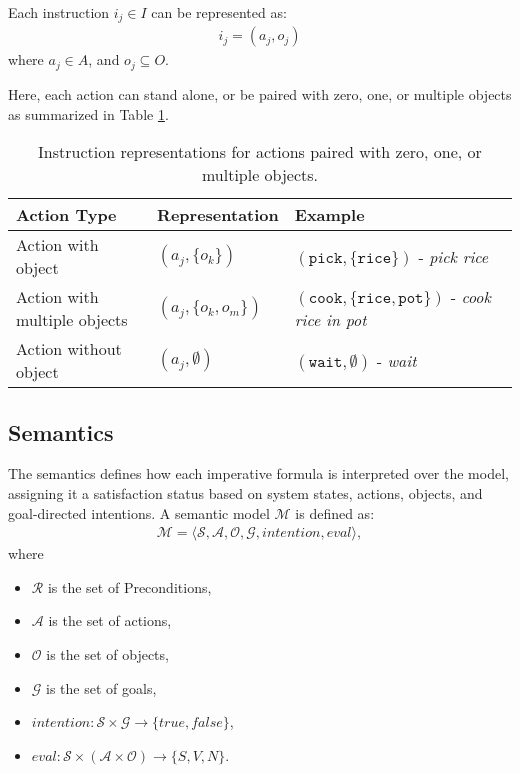 \documentclass[a4paper,11pt]{lmcs}
\begin{document}
Each instruction \(i_j \in I\) can be represented as:
\begin{eqnarray}
\label{eq:ac_ob}
i_j = (a_j, o_j)
\end{eqnarray}
where \(a_j \in A\), and \(o_j \subseteq O\).

Here, each action can stand alone, or be paired with zero, one, or multiple objects as summarized in Table \ref{tab:ac_ob}.

\begin{table}[h!]
\label{tab:ac_ob}
\centering
\begin{tabular}{|l|l|l|}
\hline
\textbf{Action Type}           & \textbf{Representation}             & \textbf{Example}                \\
\hline
Action with object             & \((a_j, \{ o_k \})\)                & \((\texttt{pick}, \{\texttt{rice}\})\) - \emph{pick rice} \\
\hline
Action with multiple objects   & \((a_j, \{ o_k, o_m \})\)          & \((\texttt{cook}, \{\texttt{rice}, \texttt{pot}\})\) - \emph{cook rice in pot} \\
\hline
Action without object          & \((a_j, \emptyset)\)                & \((\texttt{wait}, \emptyset)\) - \emph{wait} \\
\hline
\end{tabular}
\caption{Instruction representations for actions paired with zero, one, or multiple objects.}
\end{table}


\subsection{Semantics}
The semantics defines how each imperative formula is interpreted over the model, assigning it a satisfaction status based on system states, actions, objects, and goal-directed intentions.
A semantic model \(\mathcal{M}\) is defined as:
\begin{eqnarray}
\label{eq:model}
\mathcal{M} = \langle \mathcal{S}, \mathcal{A}, \mathcal{O}, \mathcal{G}, intention, eval \rangle,
\end{eqnarray}
where
\begin{itemize}
    \item \(\mathcal{R}\) is the set of Preconditions,
    \item \(\mathcal{A}\) is the set of actions,
    \item \(\mathcal{O}\) is the set of objects,
    \item \(\mathcal{G}\) is the set of goals,
    \item \(intention : \mathcal{S} \times \mathcal{G} \to \{ true, false \}\),
    \item \(eval : \mathcal{S} \times (\mathcal{A} \times \mathcal{O}) \to \{ S, V, N \}\).
\end{itemize}
\end{document}
